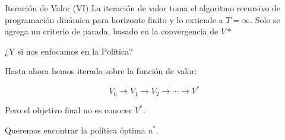 \documentclass[xcolor=dvipsnames]{beamer}
\begin{document}
\begin{frame}{Iteración de Valor (VI)}
La iteraci\'on de valor toma el algoritmo recursivo de programación dinámica para horizonte finito y lo extiende a $T = \infty$. Solo se agrega un criterio de parada, basado en la convergencia de $V*$
\end{frame}
\begin{frame}{¿Y si nos enfocamos en la Política?}

Hasta ahora hemos iterado sobre la función de valor:

\[
V_0 \rightarrow V_1 \rightarrow V_2 \rightarrow \cdots \rightarrow V^*
\]

\vspace{0.3cm}

Pero el objetivo final no es conocer $V^*$.

\vspace{0.2cm}

\begin{center}
\Large
Queremos encontrar la política óptima $u^*$.
\end{center}

\vspace{0.3cm}


\end{frame}
\end{document}

